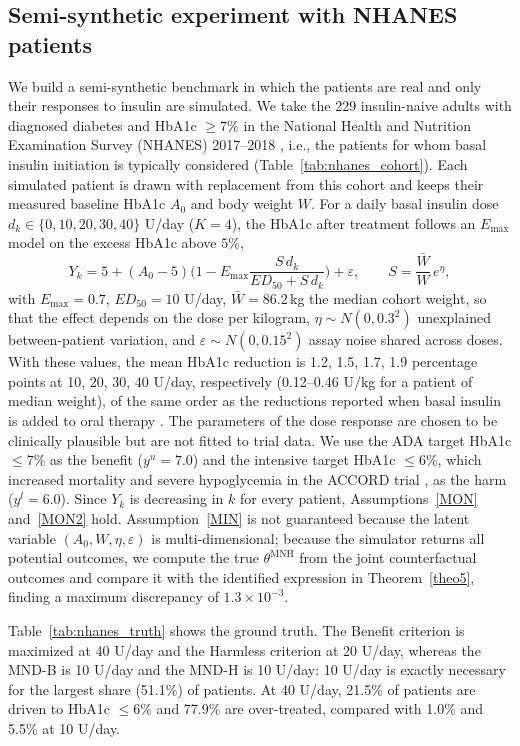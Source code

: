 \subsection{Semi-synthetic experiment with NHANES patients}\label{appB3}
We build a semi-synthetic benchmark in which the patients are real and only their responses to insulin are simulated. We take the 229 insulin-naive adults with diagnosed diabetes and HbA1c $\ge7\%$ in the National Health and Nutrition Examination Survey (NHANES) 2017--2018 \citep{nhanes2017}, i.e., the patients for whom basal insulin initiation is typically considered (Table~\ref{tab:nhanes_cohort}). Each simulated patient is drawn with replacement from this cohort and keeps their measured baseline HbA1c $A_0$ and body weight $W$.
For a daily basal insulin dose $d_k\in\{0, 10, 20, 30, 40\}$ U/day ($K=4$), the HbA1c after treatment follows an $E_{\max}$ model on the excess HbA1c above $5\%$,
\[Y_k=5+(A_0-5)\Big(1-E_{\max}\frac{S\,d_k}{ED_{50}+S\,d_k}\Big)+\varepsilon,\qquad S=\frac{\bar W}{W}\,e^{\eta},\]
with $E_{\max}=0.7$, $ED_{50}=10$ U/day, $\bar W=86.2$\,kg the median cohort weight, so that the effect depends on the dose per kilogram, $\eta\sim N(0,0.3^2)$ unexplained between-patient variation, and $\varepsilon\sim N(0,0.15^2)$ assay noise shared across doses. With these values, the mean HbA1c reduction is 1.2, 1.5, 1.7, 1.9 percentage points at 10, 20, 30, 40 U/day, respectively (0.12--0.46 U/kg for a patient of median weight), of the same order as the reductions reported when basal insulin is added to oral therapy \citep{riddle2003}. The parameters of the dose response are chosen to be clinically plausible but are not fitted to trial data. We use the ADA target HbA1c $\le7\%$ \citep{ada2025glycemic} as the benefit ($y^u=7.0$) and the intensive target HbA1c $\le6\%$, which increased mortality and severe hypoglycemia in the ACCORD trial \citep{accord2008}, as the harm ($y^l=6.0$).
Since $Y_k$ is decreasing in $k$ for every patient, Assumptions~\ref{MON} and~\ref{MON2} hold. Assumption~\ref{MIN} is not guaranteed because the latent variable $(A_0,W,\eta,\varepsilon)$ is multi-dimensional; because the simulator returns all potential outcomes, we compute the true $\theta^{\text{MNH}}$ from the joint counterfactual outcomes and compare it with the identified expression in Theorem~\ref{theo5}, finding a maximum discrepancy of $1.3\times10^{-3}$.

Table~\ref{tab:nhanes_truth} shows the ground truth. The Benefit criterion is maximized at 40 U/day and the Harmless criterion at 20 U/day, whereas the MND-B is 10 U/day and the MND-H is 10 U/day: 10 U/day is exactly necessary for the largest share (51.1\%) of patients. At 40 U/day, 21.5\% of patients are driven to HbA1c $\le6\%$ and 77.9\% are over-treated, compared with 1.0\% and 5.5\% at 10 U/day.

